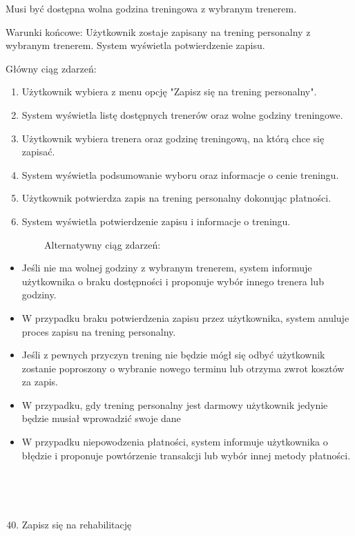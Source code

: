 \documentclass[
]{article}
\providecommand{\tightlist}{%
  \setlength{\itemsep}{0pt}\setlength{\parskip}{0pt}}
\begin{document}
{Musi być dostępna wolna godzina treningowa z wybranym trenerem.}

{Warunki końcowe: Użytkownik zostaje zapisany na trening personalny z
wybranym trenerem. System wyświetla potwierdzenie zapisu.}

{Główny ciąg zdarzeń:}

\begin{enumerate}
\tightlist
\item
  {Użytkownik wybiera z menu opcję "Zapisz się na trening personalny".}
\item
  {System wyświetla listę dostępnych trenerów oraz wolne godziny
  treningowe.}
\item
  {Użytkownik wybiera trenera oraz godzinę treningową, na którą chce się
  zapisać.}
\item
  {System wyświetla podsumowanie wyboru oraz informacje o cenie
  treningu.}
\item
  {Użytkownik potwierdza zapis na trening personalny dokonując
  płatności.}
\item
  {System wyświetla potwierdzenie zapisu i informacje o treningu.}
\end{enumerate}

{~~~~~~~~Alternatywny ciąg zdarzeń:}

\begin{itemize}
\tightlist
\item
  {Jeśli nie ma wolnej godziny z wybranym trenerem, system informuje
  użytkownika o braku dostępności i proponuje wybór innego trenera lub
  godziny.}
\item
  {W przypadku braku potwierdzenia zapisu przez użytkownika, system
  anuluje proces zapisu na trening personalny.}
\item
  {Jeśli z pewnych przyczyn trening nie będzie mógł się odbyć użytkownik
  zostanie poproszony o wybranie nowego terminu lub otrzyma zwrot
  kosztów za zapis.}
\item
  {W przypadku, gdy trening personalny jest darmowy użytkownik jedynie
  będzie musiał wprowadzić swoje dane}
\item
  {W przypadku niepowodzenia płatności, system informuje użytkownika o
  błędzie i proponuje powtórzenie transakcji lub wybór innej metody
  płatności.\\
  \strut \\
  \strut \\
  }
\end{itemize}

\begin{enumerate}
\setcounter{enumi}{39}
\tightlist
\item
  {Zapisz się na rehabilitację}
\end{enumerate}
\end{document}
